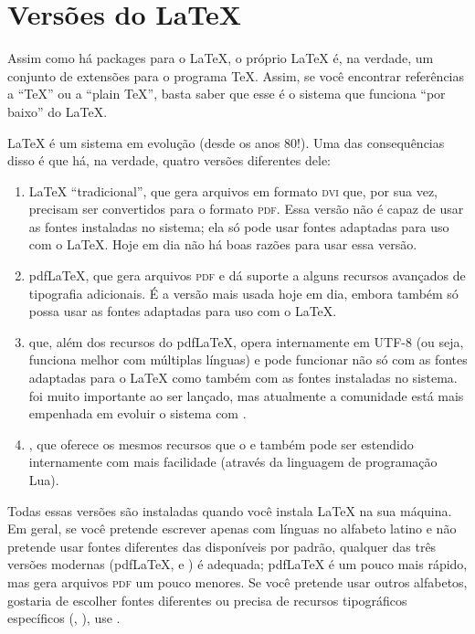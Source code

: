 \section{Versões do \LaTeX{}}
\label{sec:versions}

Assim como há packages para o \LaTeX{}, o próprio \LaTeX{} é, na verdade, um
conjunto de extensões para o programa \TeX{}. Assim, se você encontrar
referências a ``\TeX{}'' ou a ``plain \TeX{}'', basta saber que esse é o
sistema que funciona ``por baixo'' do \LaTeX{}.

\LaTeX{} é um sistema em evolução (desde os anos 80!). Uma das consequências
disso é que há, na verdade, quatro versões diferentes dele:

\begin{enumerate}
\item \LaTeX{} ``tradicional'', que gera arquivos em formato \textsc{dvi}
que, por sua vez, precisam ser convertidos para o formato \textsc{pdf}.
Essa versão não é capaz de usar as fontes instaladas no sistema; ela só
pode usar fontes adaptadas para uso com o \LaTeX{}. Hoje em dia não há
boas razões para usar essa versão.

\item pdf\LaTeX{}, que gera arquivos \textsc{pdf} e dá suporte a alguns
recursos avançados de tipografia adicionais. É a versão mais usada hoje
em dia, embora também só possa usar as fontes adaptadas para uso com o
\LaTeX{}.

\item \XeLaTeX{} que, além dos recursos do pdf\LaTeX{}, opera internamente
em UTF-8 (ou seja, funciona melhor com múltiplas línguas) e pode funcionar
não só com as fontes adaptadas para o \LaTeX{} como também com as fontes
instaladas no sistema. \XeLaTeX{} foi muito importante ao ser lançado,
mas atualmente a comunidade está mais empenhada em evoluir o sistema com
\LuaLaTeX{}.

\item \LuaLaTeX{}, que oferece os mesmos recursos que o \XeLaTeX{} e
também pode ser estendido internamente com mais facilidade (através da
linguagem de programação Lua).
\end{enumerate}

Todas essas versões são instaladas quando você instala \LaTeX{} na
sua máquina. Em geral, se você pretende escrever apenas com línguas no
alfabeto latino e não pretende usar fontes diferentes das disponíveis
por padrão, qualquer das três versões modernas (pdf\LaTeX{},
\XeLaTeX{} e \LuaLaTeX{}) é adequada; pdf\LaTeX{} é um pouco mais
rápido, mas \LuaLaTeX{} gera arquivos \textsc{pdf} um pouco menores.
Se você pretende usar outros alfabetos, gostaria de escolher
fontes diferentes ou precisa de recursos tipográficos específicos
(, ), use \LuaLaTeX{}.

